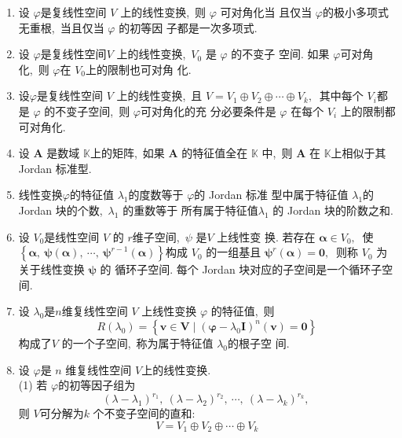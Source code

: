 \begin{enumerate}
		(3)  $\boldsymbol{A}$ 的初等因子都是一次多项式.
		\item 设  $\varphi  $是复线性空间  $V $ 上的线性变换,\  则 $ \varphi$  可对角化当 且仅当  $\varphi  $的极小多项式无重根,\ 当且仅当  $\varphi $ 的初等因 子都是一次多项式.
		\item 设 $ \varphi  $是复线性空间$  V$  上的线性变换,\  $ V_{0} $ 是  $\varphi$  的不变子 空间. 如果  $\varphi  $可对角化,\  则  $\varphi  $在  $V_{0}  $上的限制也可对角 化.
		\item 设$  \varphi  $是复线性空间  $V $ 上的线性变换,\  且
		$V=V_{1} \oplus V_{2} \oplus \cdots \oplus V_{k},\ $
		其中每个 $ V_{i}  $都是  $\varphi $ 的不变子空间,\  则  $\varphi  $可对角化的充 分必要条件是  $\varphi$  在每个  $V_{i} $ 上的限制都可对角化.
		\item 设  $\boldsymbol{A}$  是数域 $ \mathbb{K}  $上的矩阵,\  如果  $\boldsymbol{A} $ 的特征值全在  $\mathbb{K}$  中,\  则 $ \boldsymbol{A}$  在 $ \mathbb{K}  $上相似于其 Jordan 标准型.
		\item 线性变换$  \varphi $的特征值 $ \lambda_{1}  $的度数等于 $ \varphi  $的 Jordan 标准 型中属于特征值 $ \lambda_{1}  $的 Jordan 块的个数,\   $\lambda_{1}$  的重数等于 所有属于特征值$  \lambda_{1} $ 的 Jordan 块的阶数之和.
		\item 设 $ V_{0}  $是线性空间 $ V$  的 $ r  $维子空间,\  $ \psi $ 是$  V $ 上线性变 换. 若存在 $ \boldsymbol{\alpha} \in V_{0} ,\ $ 使  $\left\{\boldsymbol{\alpha},\  \boldsymbol{\psi}(\boldsymbol{\alpha}),\  \cdots,\  \boldsymbol{\psi}^{r-1}(\boldsymbol{\alpha})\right\}  $构成  $V_{0} $ 的一组基且  $\boldsymbol{\psi}^{r}(\boldsymbol{\alpha})=\mathbf{0} ,\ $ 则称  $V_{0}$  为关于线性变换  $\boldsymbol{\psi} $ 的 循环子空间.
		每个 Jordan 块对应的子空间是一个循环子空间.
		\item 设 $ \lambda_{0}  $是$  n  $维复线性空间  $V$  上线性变换  $\varphi $ 的特征值,\  则
		$$R\left(\lambda_{0}\right)=\left\{\boldsymbol{v} \in \boldsymbol{V} \mid\left(\boldsymbol{\varphi}-\lambda_{0} \boldsymbol{I}\right)^{n}(\boldsymbol{v})=\mathbf{0}\right\}$$
		构成了$  V $ 的一个子空间,\  称为属于特征值 $ \lambda_{0}  $的根子空 间.
		\item 设 $ \varphi $是  $n$  维复线性空间 $ V  $上的线性变换.\\
		(1) 若 $ \varphi  $的初等因子组为
		$$\left(\lambda-\lambda_{1}\right)^{r_{1}},\ \left(\lambda-\lambda_{2}\right)^{r_{2}},\  \cdots,\ \left(\lambda-\lambda_{k}\right)^{r_{k}},\ $$
		则  $V  $可分解为$  k $ 个不变子空间的直和:
		$$V=V_{1} \oplus V_{2} \oplus \cdots \oplus V_{k}$$

\end{enumerate}
